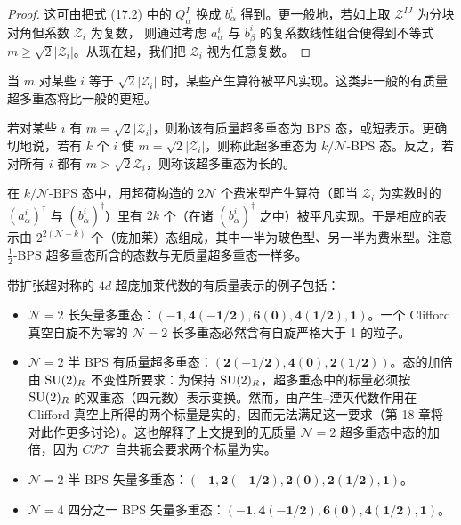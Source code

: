 \begin{proof} 这可由把式 (17.2) 中的 $Q^I_\alpha$ 换成 $b^i_\alpha$ 得到。更一般地，若如上取 $\mathcal{Z}^{IJ}$ 为分块对角但系数 $\mathcal{Z}_i$ 为复数，
则通过考虑 $a^i_\alpha$ 与 $b^i_\beta$ 的复系数线性组合便得到不等式 $m\ge\sqrt{2}|\mathcal{Z}_i|$。从现在起，我们把 $\mathcal{Z}_i$ 视为任意复数。
\end{proof}

当 $m$ 对某些 $i$ 等于 $\sqrt{2}|\mathcal{Z}_i|$ 时，某些产生算符被平凡实现。这类非一般的有质量超多重态将比一般的更短。

\begin{definition}[17.7] 若对某些 $i$ 有 $m=\sqrt{2}|\mathcal{Z}_i|$，则称该有质量超多重态为 BPS 态，或短表示。更确切地说，若有 $k$ 个 $i$ 使 $m=\sqrt{2}|\mathcal{Z}_i|$，则称此超多重态为 $k/\mathcal{N}$-BPS 态。反之，若对所有 $i$ 都有 $m>\sqrt{2}\mathcal{Z}_i$，则称该超多重态为长的。\end{definition}

在 $k/\mathcal{N}$-BPS 态中，用超荷构造的 $2\mathcal{N}$ 个费米型产生算符（即当 $\mathcal{Z}_i$ 为实数时的 $(a^i_\alpha)^\dagger$ 与 $(b^i_\alpha)^\dagger$）里有 $2k$ 个（在诸 $(b^i_\alpha)^\dagger$ 之中）被平凡实现。于是相应的表示由 $2^{2(\mathcal{N}-k)}$ 个（庞加莱）态组成，其中一半为玻色型、另一半为费米型。注意 $\frac{1}{2}$-BPS 超多重态所含的态数与无质量超多重态一样多。

带扩张超对称的 $4d$ 超庞加莱代数的有质量表示的例子包括：

\begin{itemize}[leftmargin=2em]
\item $\mathcal{N}=2$ 长矢量多重态：$(-\mathbf{1},\mathbf{4}(-\mathbf{1/2}),\mathbf{6}(\mathbf{0}),\mathbf{4}(\mathbf{1/2}),\mathbf{1})$。一个 Clifford 真空自旋不为零的 $\mathcal{N}=2$ 长多重态必然含有自旋严格大于 1 的粒子。
\item $\mathcal{N}=2$ 半 BPS 有质量超多重态：$(\mathbf{2}(-\mathbf{1/2}),\mathbf{4}(\mathbf{0}),\mathbf{2}(\mathbf{1/2}))$。态的加倍由 $\operatorname{SU}(2)_R$ 不变性所要求：为保持 $\operatorname{SU}(2)_R$，超多重态中的标量必须按 $\operatorname{SU}(2)_R$ 的双重态（四元数）表示变换。然而，由产生–湮灭代数作用在 Clifford 真空上所得的两个标量是实的，因而无法满足这一要求（第 18 章将对此作更多讨论）。这也解释了上文提到的无质量 $\mathcal{N}=2$ 超多重态中态的加倍，因为 $C\mathcal{PT}$ 自共轭会要求两个标量为实。
\item $\mathcal{N}=2$ 半 BPS 矢量多重态：$(-\mathbf{1},\mathbf{2}(-\mathbf{1/2}),\mathbf{2}(\mathbf{0}),\mathbf{2}(\mathbf{1/2}),\mathbf{1})$。
\item $\mathcal{N}=4$ 四分之一 BPS 矢量多重态：$(-\mathbf{1},\mathbf{4}(-\mathbf{1/2}),\mathbf{6}(\mathbf{0}),\mathbf{4}(\mathbf{1/2}),\mathbf{1})$。
\end{itemize}

